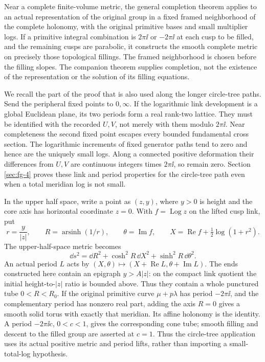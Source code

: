 Near a complete finite-volume metric, the general completion theorem
\cite[Proposition~6.1]{MarkedFillings} applies to an actual representation
of the original group in a fixed framed neighborhood of the complete
holonomy, with the original primitive bases and small multiplier logs.
If a primitive
integral combination is \(2\pi\ii\) or \(-2\pi\ii\) at each cusp to be
filled, and the remaining cusps are parabolic, it constructs the smooth
complete metric on precisely those topological fillings. The framed
neighborhood is chosen before the filling slopes. The companion theorem
supplies completion, not the existence of the representation or the
solution of its filling equations.

We recall the part of the proof that is also used along the longer
circle-tree paths. Send the peripheral fixed points to \(0,\infty\).
If the logarithmic link development is a global Euclidean plane, its
two periods form a real rank-two lattice. They must be identified with
the recorded \(U,V\), not merely with them modulo \(2\pi\ii\).
Near completeness the second fixed point escapes every bounded
fundamental cross section. The logarithmic increments of fixed
generator paths tend to zero and hence are the uniquely small logs.
Along a connected positive deformation their differences from \(U,V\)
are continuous integers times \(2\pi\ii\), so remain zero. Section
\ref{sec:fg-4} proves these link and period properties for the
circle-tree path even when a total meridian log is not small.

In the upper half space, write a point as $(z,y)$, where $y>0$ is
height and the core axis has horizontal coordinate $z=0$. With
$f=\operatorname{Log}z$ on the lifted cusp link, put
\[
 r=\frac{y}{|z|},\qquad R=\operatorname{arsinh}(1/r),\qquad
 \theta=\operatorname{Im}f,\qquad
 X=\operatorname{Re}f+\tfrac12\log(1+r^2).
\]
The upper-half-space metric becomes
\begin{equation}\label{eq:app-smooth-tube}
 \dd s^2=\dd R^2+\cosh^2R\,\dd X^2+
                                \sinh^2R\,\dd\theta^2.
\end{equation}
An actual period \(L\) acts by
\((X,\theta)\mapsto(X+\operatorname{Re}L,
                       \theta+\operatorname{Im}L)\).
The ends constructed here contain an epigraph \(y>A|z|\): on the compact
link quotient the initial height-to-\(|z|\) ratio is bounded above.
Thus they contain a whole punctured tube \(0<R<R_0\).
If the original primitive curve \(\mu+p\lambda\) has period
\(-2\pi\ii\), and the complementary period has nonzero real part,
adding the axis \(R=0\) gives a smooth solid torus with exactly that
meridian. Its affine holonomy is the identity. A period
\(-2\pi\ii c\), \(0<c<1\), gives the corresponding cone tube;
smooth filling and descent to the filled group are asserted at \(c=1\).
Thus the circle-tree application uses its actual positive metric and
period lifts, rather than importing a small-total-log hypothesis.

